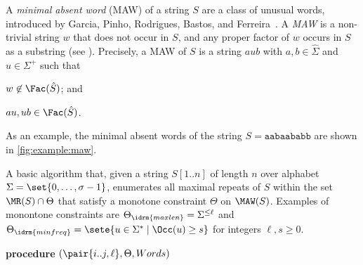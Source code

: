 A \textit{minimal absent word} (MAW) of a string $S$ are a class of unusual words, introduced by Garcia, Pinho, Rodrigues, Bastos, and Ferreira~\cite{garcia2011minimal}. A \textit{MAW} is a non-trivial string $w$ that does not occur in $S$, and any proper factor of $w$ occurs in $S$ as a substring (see \cite{garcia2011minimal}).
Precisely, a MAW of $S$ is a string $a u b$ with $a, b\in \hat\Sigma$ and $u \in \Sigma^+$ such that
\begin{enumerate*}[(i)]
\item $w \not\in \Fac(\hat S)$; and 
\item $au, ub \in \Fac(\hat S)$. 
\end{enumerate*}

As an example, the minimal absent words of the string $S = \texttt{aabaababb}$ are shown in \cref{fig:example:maw}. 


\begin{algorithm}[t]
  \caption{A basic algorithm that, given a string $S[1..n]$ of length $n$ over alphabet $\Sigma = \set{0, \dots, \sigma-1}$, enumerates all maximal repeats of $S$ within the set $\MR(S)\cap \Theta$ that satisfy a monotone constraint $\Theta$ on $\MAW(S)$. Examples of monontone constraints are
    $\Theta_\idrm{maxlen} = \Sigma^{\le \ell}$ and 
    $\Theta_\idrm{minfreq} = \sete{ u \in \Sigma^*\mid \Occ(u) \ge s }$ for integers $\ell, s\ge 0$.
}\label{fig:example:maw:main}
\textbf{procedure} \MREnum$(\pair{i..j, \ell}, \Theta, Words)$\;
\end{algorithm}


